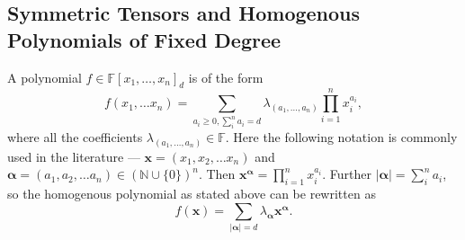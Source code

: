 \documentclass[12pt,a4paper,oneside]{book}
\def\naturals{\mathbb{N}} %
\def\field{\mathbb{F}} %
\theoremstyle{definition}
\begin{document}
\subsection*{Symmetric Tensors and Homogenous Polynomials of Fixed Degree}\label{subsection:homogenouspolyrelation}
A polynomial $f \in \field[x_1, \ldots, x_n]_d$ is of the form $$f(x_1, \ldots x_n) = \sum_{a_i \geq 0, \sum_{i}^{n} a_i = d} \lambda_{(a_1, \ldots, a_n)}\prod_{i=1}^{n}x_i^{a_i},$$where all the coefficients $\lambda_{(a_1, \ldots, a_n)} \in \field$. Here the following notation is commonly used in the literature --- $\mathbf{x} = (x_1, x_2, \ldots x_n)$ and $\mathbf{\alpha} = (a_1, a_2, \ldots a_n) \in (\naturals \cup \{0\})^n$. Then $\mathbf{x^{\alpha}} = \prod_{i=1}^{n}x_i^{a_i}$. Further $|\mathbf{\alpha}| = \sum_{i}^{n} a_i$, so the homogenous polynomial as stated above can be rewritten as $$f(\mathbf{x}) = \sum_{|\mathbf{\alpha}| = d} \lambda_{\mathbf{\alpha}}\mathbf{x^{\alpha}}.$$
\end{document}
